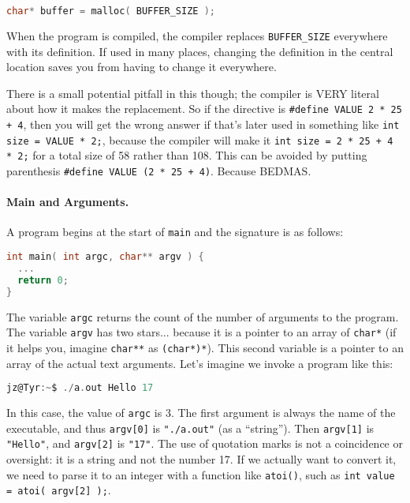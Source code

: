 \begin{lstlisting}[language=C]
char* buffer = malloc( BUFFER_SIZE );
\end{lstlisting}

When the program is compiled, the compiler replaces \texttt{BUFFER\_SIZE} everywhere with its definition. If used in many places, changing the definition in the central location saves you from having to change it everywhere.

There is a small potential pitfall in this though; the compiler is VERY literal about how it makes the replacement. So if the directive is \texttt{\#define VALUE 2 * 25 + 4}, then you will get the wrong answer if that's later used in something like \texttt{int size = VALUE * 2;}, because the compiler will make it \texttt{int size = 2 * 25 + 4 * 2;} for a total size of 58 rather than 108. This can be avoided by putting parenthesis \texttt{\#define VALUE (2 * 25 + 4)}. Because BEDMAS.

\paragraph{Main and Arguments.}
A program begins at the start of \texttt{main} and the signature is as follows:

\begin{lstlisting}[language=C]
int main( int argc, char** argv ) {
  ...
  return 0;
}
\end{lstlisting}

The variable \texttt{argc} returns the count of the number of arguments to the program. The variable \texttt{argv} has two stars... because it is a pointer to an array of \texttt{char*} (if it helps you, imagine \texttt{char**} as \texttt{(char*)*}). This second variable is a pointer to an array of the actual text arguments. Let's imagine we invoke a program like this:

\begin{lstlisting}[language=C]
jz@Tyr:~$ ./a.out Hello 17
\end{lstlisting}

In this case, the value of \texttt{argc} is 3. The first argument is always the name of the executable, and thus \texttt{argv[0]} is \texttt{"./a.out"} (as a ``string''). Then \texttt{argv[1]} is \texttt{"Hello"}, and \texttt{argv[2]} is \texttt{"17"}.  The use of quotation marks is not a coincidence or oversight: it is a string and not the number 17. If we actually want to convert it, we need to parse it to an integer with a function like \texttt{atoi()}, such as \texttt{int value = atoi( argv[2] );}.


